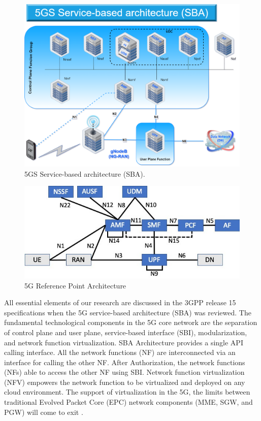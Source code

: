 \begin{figure}

\centering
\includegraphics[scale=0.25]{images/5G_SBA.png}
\caption{5GS Service-based architecture (SBA)\cite{5G_Sys_arch_5Gsystem2018study}.}
\label{fig:5G_SBA}
\end{figure}
 
  
\begin{figure}

\centering
\includegraphics[scale=0.60]{images/5G_Reference_Point_Architecture.png} 
\caption{5G Reference Point Architecture}
\label{fig:5G_Reference_Point_Architecture}
\end{figure}

All essential elements of our research are discussed in the 3GPP release 15 specifications when the 5G service-based architecture (SBA) was reviewed. The fundamental technological components in the 5G core network are the separation of control plane and user plane, service-based interface (SBI), modularization, and network function virtualization. SBA Architecture provides a single API calling interface.  All the network functions (NF) are interconnected via an interface for calling the other NF. 
After Authorization, the network functions (NFs) able to access the other NF using SBI. Network function virtualization (NFV) empowers the network function to be virtualized and deployed on any cloud environment. The support of virtualization in the 5G, the limits between traditional Evolved Packet Core (EPC) network components (MME, SGW, and PGW) will come to exit \cite{5G_Tech_Spec_Group_Ser2018study}.

